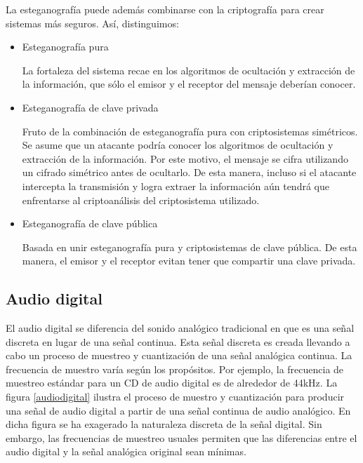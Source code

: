 \documentclass[12pt]{article}
\begin{document}
La esteganografía puede además combinarse con la criptografía para crear sistemas más seguros. Así, distinguimos:

\begin{itemize}

\item Esteganografía pura

La fortaleza del sistema recae en los algoritmos de ocultación y extracción de la información, que sólo el emisor y el receptor del mensaje deberían conocer.

\item Esteganografía de clave privada

Fruto de la combinación de esteganografía pura con criptosistemas simétricos. Se asume que un atacante podría conocer los algoritmos de ocultación y extracción de la información. Por este motivo, el mensaje se cifra utilizando un cifrado simétrico antes de ocultarlo. De esta manera, incluso si el atacante intercepta la transmisión y logra extraer la información aún tendrá que enfrentarse al criptoanálisis del criptosistema utilizado.

\item Esteganografía de clave pública

Basada en unir esteganografía pura y criptosistemas de clave pública. De esta manera, el emisor y el receptor evitan tener que compartir una clave privada.

\end{itemize}

\subsection{Audio digital}

El audio digital se diferencia del sonido analógico tradicional en que es una señal discreta en lugar de una señal continua. Esta señal discreta es creada llevando a cabo un proceso de muestreo y cuantización de una señal analógica continua. La frecuencia de muestro varía según los propósitos. Por ejemplo, la frecuencia de muestreo estándar para un CD de audio digital es de alrededor de 44kHz. La figura \ref{audiodigital} ilustra el proceso de muestro y cuantización para producir una señal de audio digital a partir de una señal continua de audio analógico.
En dicha figura se ha exagerado la naturaleza discreta de la señal digital. Sin embargo, las frecuencias de muestreo usuales permiten que las diferencias entre el audio digital y la señal analógica original sean mínimas.
\end{document}
